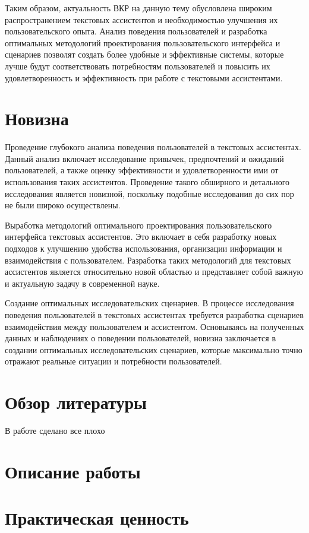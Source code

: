 \documentclass{article}
\begin{document}
Таким образом, актуальность ВКР на данную тему обусловлена широким распространением текстовых ассистентов и необходимостью улучшения их пользовательского опыта. Анализ поведения пользователей и разработка оптимальных методологий проектирования пользовательского интерфейса и сценариев позволят создать более удобные и эффективные системы, которые лучше будут соответствовать потребностям пользователей и повысить их удовлетворенность и эффективность при работе с текстовыми ассистентами.
\section{Новизна}

Проведение глубокого анализа поведения пользователей в текстовых ассистентах. Данный анализ включает исследование привычек, предпочтений и ожиданий пользователей, а также оценку эффективности и удовлетворенности ими от использования таких ассистентов. Проведение такого обширного и детального исследования является новизной, поскольку подобные исследования до сих пор не были широко осуществлены.

Выработка методологий оптимального проектирования пользовательского интерфейса текстовых ассистентов. Это включает в себя разработку новых подходов к улучшению удобства использования, организации информации и взаимодействия с пользователем. Разработка таких методологий для текстовых ассистентов является относительно новой областью и представляет собой важную и актуальную задачу в современной науке.

Создание оптимальных исследовательских сценариев. В процессе исследования поведения пользователей в текстовых ассистентах требуется разработка сценариев взаимодействия между пользователем и ассистентом. Основываясь на полученных данных и наблюдениях о поведении пользователей, новизна заключается в создании оптимальных исследовательских сценариев, которые максимально точно отражают реальные ситуации и потребности пользователей.
\section{Обзор литературы}
В работе \cite{greenwade93} сделано все плохо
\section{Описание работы}
\section{Практическая ценность}
\end{document}
